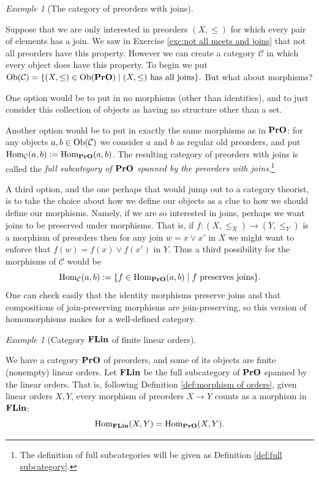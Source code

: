 \documentclass{book}
\def\tn{\textnormal}
\def\mc{\mathcal}
\def\Hom{\tn{Hom}}
\def\Ob{\tn{Ob}}
\def\to{\rightarrow}
\def\taking{\colon}
\def\|{{\;|\;}}
\def\FLin{{\bf FLin}}
\def\PrO{{\bf PrO}}
\def\mcC{\mc{C}}
\theoremstyle{remark}
\newtheorem{example}[subsubsection]{Example}
\theoremstyle{definition}
\begin{document}
\begin{example}[The category of preorders with joins]\label{ex:preorders with joins}

Suppose that we are only interested in preorders $(X,\leq)$ for which every pair of elements has a join. We saw in Exercise \ref{exc:not all meets and joins} that not all preorders have this property. However we can create a category $\mcC$ in which every object does have this property. To begin we put $\Ob(\mcC)=\{(X,\leq)\in\Ob(\PrO)\| (X,\leq)\tn{ has all joins}\}.$ But what about morphisms?

One option would be to put in no morphisms (other than identities), and to just consider this collection of objects as having no structure other than a set.

Another option would be to put in exactly the same morphisms as in $\PrO$: for any objects $a,b\in\Ob(\mcC)$ we consider $a$ and $b$ as regular old preorders, and put $\Hom_\mcC(a,b):=\Hom_{\PrO}(a,b)$. The resulting category of preorders with joins is called the {\em full subcategory of $\PrO$ spanned by the preorders with joins}.\footnote{The definition of full subcategories will be given as Definition \ref{def:full subcategory}.}

A third option, and the one perhaps that would jump out to a category theorist, is to take the choice about how we define our objects as a clue to how we should define our morphisms. Namely, if we are so interested in joins, perhaps we want joins to be preserved under morphisms. That is, if $f\taking (X,\leq_X)\to (Y,\leq_Y)$ is a morphism of preorders then for any join $w=x\vee x'$ in $X$ we might want to enforce that $f(w)=f(x)\vee f(x')$ in $Y$. Thus a third possibility for the morphisms of $\mcC$ would be $$\Hom_\mcC(a,b):=\{f\in\Hom_{\PrO}(a,b)\|f \tn{ preserves joins}\}.$$ One can check easily that the identity morphisms preserve joins and that compositions of join-preserving morphisms are join-preserving, so this version of homomorphisms makes for a well-defined category.

\end{example}

\begin{example}[Category $\FLin$ of finite linear orders]\label{ex:FLin}\index{a category!$\FLin$}

We have a category $\PrO$ of preorders, and some of its objects are finite (nonempty) linear orders. Let $\FLin$ be the full subcategory of $\PrO$ spanned by the linear orders. That is, following Definition \ref{def:morphism of orders}, given linear orders $X,Y$, every morphism of preorders $X\to Y$ counts as a morphism in $\FLin$: $$\Hom_\FLin(X,Y)=\Hom_\PrO(X,Y).$$ 

\end{example}
\end{document}
